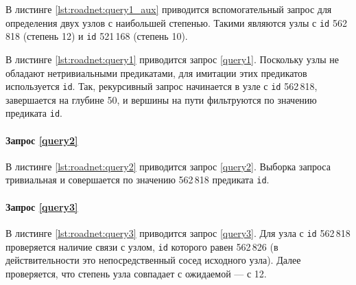 В листинге \ref{lst:roadnet:query1_aux} приводится вспомогательный запрос для определения двух узлов с наибольшей
степенью. Такими являются узлы с \texttt{id} 562\,818 (степень 12) и \texttt{id} 521\,168 (степень 10).


В листинге \ref{lst:roadnet:query1} приводится запрос \ref{query1}. Поскольку узлы не обладают нетривиальными предикатами,
для имитации этих предикатов используется \texttt{id}. Так, рекурсивный запрос начинается в узле с \texttt{id} 562\,818,
завершается на глубине 50, и вершины на пути фильтруются по значению предиката \texttt{id}.


\paragraph{Запрос \ref{query2}}

В листинге \ref{lst:roadnet:query2} приводится запрос \ref{query2}. Выборка запроса тривиальная и совершается по
значению 562\,818 предиката \texttt{id}.


\paragraph{Запрос \ref{query3}}

В листинге \ref{lst:roadnet:query3} приводится запрос \ref{query3}. Для узла с \texttt{id} 562\,818 проверяется наличие
связи с узлом, \texttt{id} которого равен 562\,826 (в действительности это непосредственный сосед исходного узла). Далее
проверяется, что степень узла совпадает с ожидаемой --- с 12.


